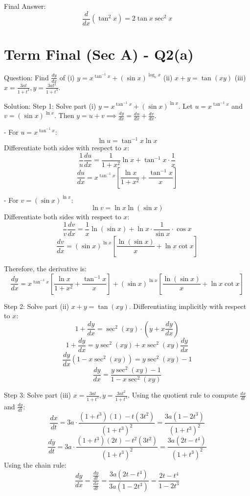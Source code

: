 \documentclass[11pt, a4paper]{article}
\begin{document}
Final Answer:
$$
\boxed{\frac{d}{dx}(\tan^2 x) = 2 \tan x \sec^2 x}
$$


\section*{Term Final (Sec A) - Q2(a)}
Question:
Find $\frac{dy}{dx}$ of 
(i) $y = x^{\tan^{-1} x} + (\sin x)^{\log_e x}$
(ii) $x + y = \tan(xy)$
(iii) $x = \frac{3at}{1+t^3}, y = \frac{3at^2}{1+t^3}$.

Solution:
Step 1: Solve part (i) $y = x^{\tan^{-1} x} + (\sin x)^{\ln x}$.
Let $u = x^{\tan^{-1} x}$ and $v = (\sin x)^{\ln x}$. Then $y = u + v \implies \frac{dy}{dx} = \frac{du}{dx} + \frac{dv}{dx}$.

- For $u = x^{\tan^{-1} x}$:
  $$\ln u = \tan^{-1} x \ln x$$
  Differentiate both sides with respect to $x$:
  $$\frac{1}{u} \frac{du}{dx} = \frac{1}{1+x^2} \ln x + \tan^{-1} x \cdot \frac{1}{x}$$
  $$\frac{du}{dx} = x^{\tan^{-1} x} \left[ \frac{\ln x}{1+x^2} + \frac{\tan^{-1} x}{x} \right]$$

- For $v = (\sin x)^{\ln x}$:
  $$\ln v = \ln x \ln(\sin x)$$
  Differentiate both sides with respect to $x$:
  $$\frac{1}{v} \frac{dv}{dx} = \frac{1}{x} \ln(\sin x) + \ln x \cdot \frac{1}{\sin x} \cdot \cos x$$
  $$\frac{dv}{dx} = (\sin x)^{\ln x} \left[ \frac{\ln(\sin x)}{x} + \ln x \cot x \right]$$

Therefore, the derivative is:
$$\frac{dy}{dx} = x^{\tan^{-1} x} \left[ \frac{\ln x}{1+x^2} + \frac{\tan^{-1} x}{x} \right] + (\sin x)^{\ln x} \left[ \frac{\ln(\sin x)}{x} + \ln x \cot x \right]$$

Step 2: Solve part (ii) $x + y = \tan(xy)$.
Differentiating implicitly with respect to $x$:
$$1 + \frac{dy}{dx} = \sec^2(xy) \cdot \left( y + x\frac{dy}{dx} \right)$$
$$1 + \frac{dy}{dx} = y \sec^2(xy) + x \sec^2(xy) \frac{dy}{dx}$$
$$\frac{dy}{dx} \left( 1 - x \sec^2(xy) \right) = y \sec^2(xy) - 1$$
$$\frac{dy}{dx} = \frac{y \sec^2(xy) - 1}{1 - x \sec^2(xy)}$$

Step 3: Solve part (iii) $x = \frac{3at}{1+t^3}, y = \frac{3at^2}{1+t^3}$.
Using the quotient rule to compute $\frac{dx}{dt}$ and $\frac{dy}{dt}$:
$$\frac{dx}{dt} = 3a \cdot \frac{(1+t^3)(1) - t(3t^2)}{(1+t^3)^2} = \frac{3a(1 - 2t^3)}{(1+t^3)^2}$$
$$\frac{dy}{dt} = 3a \cdot \frac{(1+t^3)(2t) - t^2(3t^2)}{(1+t^3)^2} = \frac{3a(2t - t^4)}{(1+t^3)^2}$$
Using the chain rule:
$$\frac{dy}{dx} = \frac{\frac{dy}{dt}}{\frac{dx}{dt}} = \frac{3a(2t - t^4)}{3a(1 - 2t^3)} = \frac{2t - t^4}{1 - 2t^3}$$
\end{document}
